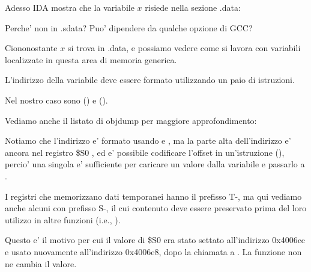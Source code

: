 Adesso IDA mostra che la variabile $x$ risiede nella sezione .data:



Perche' non in .sdata? Puo' dipendere da qualche opzione di GCC?

Ciononostante $x$ si trova in .data, e possiamo vedere come si lavora con variabili localizzate in questa area di memoria generica.


L'indirizzo della variabile deve essere formato utilizzando un paio di istruzioni.

Nel nostro caso sono  () e  ().

Vediamo anche il listato di objdump per maggiore approfondimento:




Notiamo che l'indirizzo e' formato usando  e , ma la parte alta dell'indirizzo e' ancora nel registro
\$S0 , ed e' possibile codificare l'offset in un'istruzione  (), percio' una singola  e' sufficiente 
per caricare un valore dalla variabile e passarlo a \printf.

I registri che memorizzano dati temporanei hanno il prefisso T-, ma qui vediamo anche alcuni con prefisso S-, il cui contenuto deve essere preservato prima del loro
utilizzo in altre funzioni (i.e., ).

Questo e' il motivo per cui il valore di \$S0 era stato settato all'indirizzo 0x4006cc e usato nuovamente all'indirizzo 0x4006e8, dopo la chiamata a \scanf. 
La funzione \scanf non ne cambia il valore.


